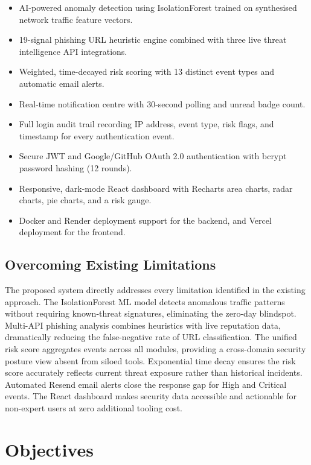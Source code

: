 \begin{itemize}
    \item AI-powered anomaly detection using IsolationForest trained on synthesised network traffic feature vectors.
    \item 19-signal phishing URL heuristic engine combined with three live threat intelligence API integrations.
    \item Weighted, time-decayed risk scoring with 13 distinct event types and automatic email alerts.
    \item Real-time notification centre with 30-second polling and unread badge count.
    \item Full login audit trail recording IP address, event type, risk flags, and timestamp for every authentication event.
    \item Secure JWT and Google/GitHub OAuth 2.0 authentication with bcrypt password hashing (12 rounds).
    \item Responsive, dark-mode React dashboard with Recharts area charts, radar charts, pie charts, and a risk gauge.
    \item Docker and Render deployment support for the backend, and Vercel deployment for the frontend.
\end{itemize}

\subsection*{Overcoming Existing Limitations}

The proposed system directly addresses every limitation identified in the existing approach. The IsolationForest ML model detects anomalous traffic patterns without requiring known-threat signatures, eliminating the zero-day blindspot. Multi-API phishing analysis combines heuristics with live reputation data, dramatically reducing the false-negative rate of URL classification. The unified risk score aggregates events across all modules, providing a cross-domain security posture view absent from siloed tools. Exponential time decay ensures the risk score accurately reflects current threat exposure rather than historical incidents. Automated Resend email alerts close the response gap for High and Critical events. The React dashboard makes security data accessible and actionable for non-expert users at zero additional tooling cost.

\section{Objectives}

